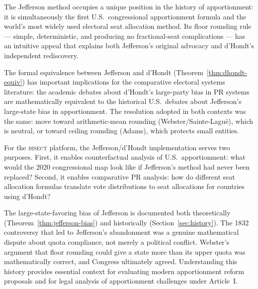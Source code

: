 The Jefferson method occupies a unique position in the history of
apportionment: it is simultaneously the first U.S.\ congressional
apportionment formula and the world's most widely used electoral
seat allocation method.
Its floor rounding rule --- simple, deterministic, and producing
no fractional-seat complications --- has an intuitive appeal that
explains both Jefferson's original advocacy and d'Hondt's independent
rediscovery.

The formal equivalence between Jefferson and d'Hondt (Theorem~\ref{thm:dhondt-equiv})
has important implications for the comparative electoral systems literature:
the academic debates about d'Hondt's large-party bias in PR systems
are mathematically equivalent to the historical U.S.\ debates about
Jefferson's large-state bias in apportionment.
The resolution adopted in both contexts was the same:
move toward arithmetic-mean rounding (Webster/Sainte-Lagu\"e),
which is neutral, or toward ceiling rounding (Adams), which
protects small entities.

For the \textsc{bisect} platform, the Jefferson/d'Hondt implementation
serves two purposes.
First, it enables counterfactual analysis of U.S.\ apportionment:
what would the 2020 congressional map look like if Jefferson's method
had never been replaced?
Second, it enables comparative PR analysis: how do different seat
allocation formulas translate vote distributions to seat allocations
for countries using d'Hondt?

The large-state-favoring bias of Jefferson is documented both theoretically
(Theorem~\ref{thm:jefferson-bias}) and historically (Section~\ref{sec:history}).
The 1832 controversy that led to Jefferson's abandonment was a
genuine mathematical dispute about quota compliance, not merely
a political conflict.
Webster's argument that floor rounding could give a state more than
its upper quota was mathematically correct, and Congress ultimately
agreed.
Understanding this history provides essential context for evaluating
modern apportionment reform proposals and for legal analysis of
apportionment challenges under Article~I.
